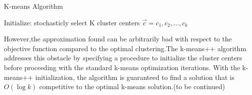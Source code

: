 \documentclass[twoside]{article}
\def\beginrefs{\begin{list}%
        {[\arabic{equation}]}{\usecounter{equation}
         \setlength{\leftmargin}{2.0truecm}\setlength{\labelsep}{0.4truecm}%
         \setlength{\labelwidth}{1.6truecm}}}
\def\endrefs{\end{list}}
\def\bibentry#1{\item[\hbox{[#1]}]}
\begin{document}
\begin{algorithm}[H]
\caption{K-means Algorithm}
Initialize: stochasticly select K cluster centers $\vec c=c_1,c_2,\dots,c_k$\\
\end{algorithm}

  However,the approximation found can be arbitrarily bad with respect to the objective function compared to the optimal clustering.The k-means++ algorithm addresses this obstacle by specifying a procedure to initialize the cluster centers before proceeding with the standard k-means optimization iterations. With the k-means++ initialization, the algorithm is guaranteed to find a solution that is $O(\log k)$ competitive to the optimal k-means solution.(to be continued)

\end{document}

